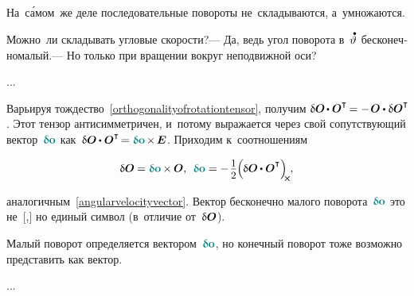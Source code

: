 \begin{otherlanguage}{russian}
На~с\'{а}мом~же деле последовательные повороты не~складываются, а~умножаются.

Можно~ли складывать угловые скорости?\:--- Да, ведь угол поворота в~$\mathdotabove{\vartheta}$ бесконечномалый.\:--- Но только при вращении вокруг неподвижной оси?


...



Варьируя тождество~\eqref{orthogonalityofrotationtensor},
получим ${\variation{\rotationtensor} \hspace{-0.2ex} \dotp \rotationtensor^{\T} \hspace{-0.2ex} = - \hspace{.2ex} \rotationtensor \dotp \variation{\rotationtensor}^{\T}\!}$.
Этот тензор антисимметричен, и~потому выражается через свой сопутствующий вектор~${\varvector{o}}$ как~${\variation{\rotationtensor} \hspace{-0.1ex} \dotp \rotationtensor^{\T} \hspace{-0.3ex} = \varvector{o} \hspace{-0.2ex} \times \hspace{-0.2ex} \UnitDyad}$.
Приходим к~соотношениям

\nopagebreak\vspace{-0.5em}\begin{equation}
\variation{\rotationtensor} \hspace{-0.1ex} = \varvector{o} \hspace{-0.1ex} \times \hspace{-0.1ex} \rotationtensor , \:\:
\varvector{o} = - \hspace{.2ex} \scalebox{.93}{$ \displaystyle\onehalf $} \hspace{-0.1ex} \Bigl( \hspace{-0.1ex} \variation{\rotationtensor} \hspace{-0.1ex} \dotp \rotationtensor^{\T} \Bigr)_{\hspace{-0.25em}\Xcompanion}
\hspace{-0.1ex} ,
\end{equation}

\vspace{-0.5em}\noindent

аналогичным~\eqref{angularvelocityvector}.
Вектор бесконечно малого поворота~${\varvector{o}}$
это не~[,]
но единый символ
(в~отличие от~${\updelta\hspace{-0.1ex}\bm{O}}$).


Малый поворот определяется вектором~${\varvector{o}}$,
но конечный поворот тоже возможно представить как вектор.


...


\end{otherlanguage}

